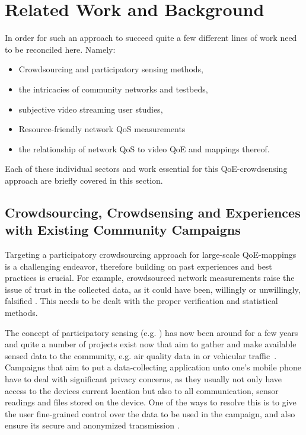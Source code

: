 \section{Related Work and Background}
\label{sec:relatedwork}

In order for such an approach to succeed quite a few different lines of work need to be reconciled here. Namely:
\begin{itemize}
	\item Crowdsourcing and participatory sensing methods,
	\item the intricacies of community networks and testbeds,
	\item subjective video streaming user studies,
	\item Resource-friendly network \gls{QoS} measurements
	\item the relationship of network \gls{QoS} to video \gls{QoE} and mappings thereof.
\end{itemize}

Each of these individual sectors and work essential for this QoE-crowdsensing approach are briefly covered in this section.


\subsection{Crowdsourcing, Crowdsensing and Experiences with Existing Community Campaigns}

Targeting a participatory crowdsourcing approach for large-scale \gls{QoE}-mappings is a challenging endeavor, therefore building on past experiences and best practices is crucial. For example, crowdsourced network measurements raise the issue of trust in the collected data, as it could have been, willingly or unwillingly, falsified \cite{Tanas2014,Hirth201585}. This needs to be dealt with the proper verification and statistical methods.

The concept of participatory sensing (e.g. \cite{Dutta:2009:CSP:1644038.1644095,Shilton:2009:FBL:1592761.1592778}) has now been around for a few years and quite a number of projects exist now that aim to gather and make available sensed data to the community, e.g. air quality data in \cite{partisensing2006} or vehicular traffic~\cite{Herrera2010568}. %
Campaigns that aim to put a data-collecting application unto one's mobile phone have to deal with significant privacy concerns, as they usually not only have access to the devices current location but also to all communication, sensor readings and files stored on the device. One of the ways to resolve this is to give the user fine-grained control over the data to be used in the campaign, and also ensure its secure and anonymized transmission \cite{raf2013sensorium,albert2016mess,zhuang2015login}.


